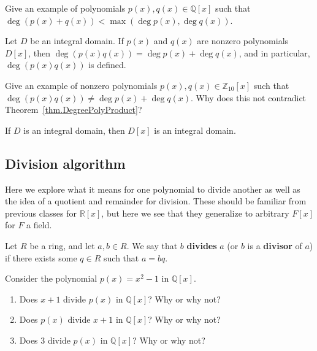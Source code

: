 \begin{problem}
Give an example of polynomials $p(x),q(x)\in \mathbb{Q}[x]$ such that $\deg(p(x)+q(x)) < \max(\deg p(x),\deg q(x))$.
\end{problem}

\begin{theorem}\label{thm.DegreePolyProduct}
Let $D$ be an integral domain. If $p(x)$ and $q(x)$ are nonzero polynomials $D[x]$, then $\deg(p(x)q(x)) = \deg p(x) + \deg q(x)$, and in particular, $\deg(p(x)q(x))$ is defined.
\end{theorem}

\begin{problem}
Give an example of nonzero polynomials $p(x),q(x)\in \mathbb{Z}_{10}[x]$ such that $\deg(p(x)q(x)) \neq \deg p(x) + \deg q(x)$. Why does this not contradict Theorem~\ref{thm.DegreePolyProduct}?
\end{problem}

\begin{corollary}\label{cor.PolysOverIntegralDomains}
If $D$ is an integral domain, then $D[x]$ is an integral domain.
\end{corollary}

\subsection{Division algorithm}
Here we explore what it means for one polynomial to divide another as well as the idea of a quotient and remainder for division. These should be familiar from previous classes for $\mathbb{R}[x]$, but here we see that they generalize to arbitrary $F[x]$ for $F$ a field.
 
\begin{definition}
Let $R$ be a ring, and let $a,b\in R$. We say that $b$ \textbf{divides} $a$ (or $b$ is a \textbf{divisor} of $a$) if there exists some $q\in R$ such that $a = bq$.
\end{definition}

\begin{problem}
Consider the polynomial $p(x) = x^2 - 1$ in $\mathbb{Q}[x]$.
\begin{enumerate}
\item Does $x+1$ divide $p(x)$ in $\mathbb{Q}[x]$? Why or why not?
\item Does $p(x)$ divide $x+1$ in $\mathbb{Q}[x]$? Why or why not?
\item Does $3$ divide $p(x)$ in $\mathbb{Q}[x]$? Why or why not?
\end{enumerate}
\end{problem}

